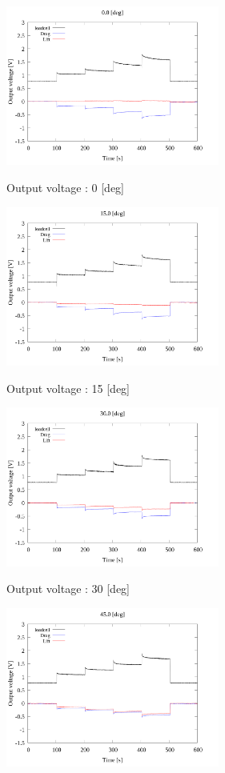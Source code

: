 \begin{multicols}{2}
    \begin{figure_here}
        \begin{center}
            \includegraphics[width=70mm]{../../02_workspace/result/2-1/plot/01-3_allsensors/01_allsensors_0.png}
            \caption{Output voltage : 0 [deg]}
            \includegraphics[width=70mm]{../../02_workspace/result/2-1/plot/01-3_allsensors/01_allsensors_150.png}
            \caption{Output voltage : 15 [deg]}
            \includegraphics[width=70mm]{../../02_workspace/result/2-1/plot/01-3_allsensors/01_allsensors_300.png}
            \caption{Output voltage : 30 [deg]}
            \includegraphics[width=70mm]{../../02_workspace/result/2-1/plot/01-3_allsensors/01_allsensors_450.png}

\end{center}
\end{figure_here}
\end{multicols}

